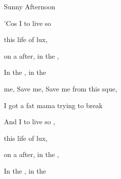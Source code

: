 \begin{SBSong}{Sunny Afternoon}
\begin{SBChorus}
    'Cos I  to live so 
    
     this life of lux, 
    
     on a  after, in the ,
    
    In the , in the  
  \end{SBChorus}
  \begin{SBChorus}
     me, Save me, Save me from this sque,
    
    I got a  fat mama trying to break  
    
    And I  to live so ,
    
     this life of lux,
    
     on a  after, in the ,
    
    In the , in the  
  \end{SBChorus}
\end{SBSong}
